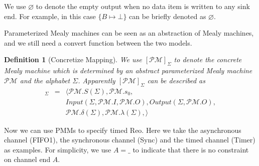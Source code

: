 \documentclass[conference, a4paper]{IEEEtran}
\newtheorem{definition}{Definition}
\newcommand{\smap}[1]{[{#1}]}
\newcommand{\rempty}[0]{\varnothing}
\begin{document}
We use $\varnothing$ to denote the empty output when no data item is written to any sink end.
For example, in this case $\{B\mapsto\bot\}$ can be briefly denoted as $\rempty$.

Parameterized Mealy machines can be seen as an abstraction of Mealy machines, and we
still need a convert function between the two models.

\begin{definition}[Concretize Mapping]
  We use $\smap{\mathcal{PM}}_{\Sigma}$ to denote the concrete Mealy machine which is determined by
  an abstract parameterized Mealy machine $\mathcal{PM}$ and the alphabet $\Sigma$. Apparently
  $\smap{\mathcal{PM}}_{\Sigma}$ can be described as
  \begin{eqnarray*}
    \smap{\mathcal{PM}}_{\Sigma} &=& 
    \langle
    \mathcal{PM}.S(\Sigma), \mathcal{PM}.s_0, \\
    & & Input(\Sigma, \mathcal{PM}.I, \mathcal{PM}.O), Output(\Sigma, \mathcal{PM}.O), \\
    & & \mathcal{PM}.\delta(\Sigma), \mathcal{PM}.\lambda(\Sigma),
    \rangle
  \end{eqnarray*}
\end{definition}

Now we can use PMMs to specify timed Reo. Here we take the asynchronous channel (FIFO1), the
synchronous channel (Sync) and the timed channel (Timer) as examples. For simplicity, we use $A=\_$
to indicate that there is no constraint on channel end $A$.
\end{document}
